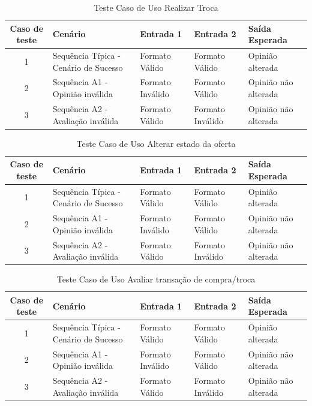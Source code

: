 \documentclass[a4paper,11pt]{article}
\begin{document}
	\begin{center}
	\begin{table}[H]
		\begin{tabularx}{\textwidth}{|c|X|X|X|X|} \hline
			\textbf{Caso de teste} & \textbf{Cenário} & \textbf{Entrada 1} & \textbf{Entrada 2} & \textbf{Saída Esperada} \\
			\hline
			1 & Sequência Típica - Cenário de Sucesso & Formato Válido & Formato Válido & Opinião alterada\\ \hline
			2 & Sequência A1 - Opinião inválida & Formato Inválido & Formato Válido & Opinião não alterada\\ \hline
			3 & Sequência A2 - Avaliação inválida & Formato Válido & Formato Inválido & Opinião não alterada\\ \hline
			
		\end{tabularx}
		\caption{Teste Caso de Uso Realizar Troca}
	\end{table}
	\end{center}
	
	\begin{center}
	\begin{table}[H]
		\begin{tabularx}{\textwidth}{|c|X|X|X|X|} \hline
			\textbf{Caso de teste} & \textbf{Cenário} & \textbf{Entrada 1} & \textbf{Entrada 2} & \textbf{Saída Esperada} \\
			\hline
			1 & Sequência Típica - Cenário de Sucesso & Formato Válido & Formato Válido & Opinião alterada\\ \hline
			2 & Sequência A1 - Opinião inválida & Formato Inválido & Formato Válido & Opinião não alterada\\ \hline
			3 & Sequência A2 - Avaliação inválida & Formato Válido & Formato Inválido & Opinião não alterada\\ \hline
			
		\end{tabularx}
		\caption{Teste Caso de Uso Alterar estado da oferta}
	\end{table}
	\end{center}
	
	\begin{center}
	\begin{table}[H]
		\begin{tabularx}{\textwidth}{|c|X|X|X|X|} \hline
			\textbf{Caso de teste} & \textbf{Cenário} & \textbf{Entrada 1} & \textbf{Entrada 2} & \textbf{Saída Esperada} \\
			\hline
			1 & Sequência Típica - Cenário de Sucesso & Formato Válido & Formato Válido & Opinião alterada\\ \hline
			2 & Sequência A1 - Opinião inválida & Formato Inválido & Formato Válido & Opinião não alterada\\ \hline
			3 & Sequência A2 - Avaliação inválida & Formato Válido & Formato Inválido & Opinião não alterada\\ \hline
			
		\end{tabularx}
		\caption{Teste Caso de Uso Avaliar transação de compra/troca}
	\end{table}
	\end{center}
	
\end{document}
